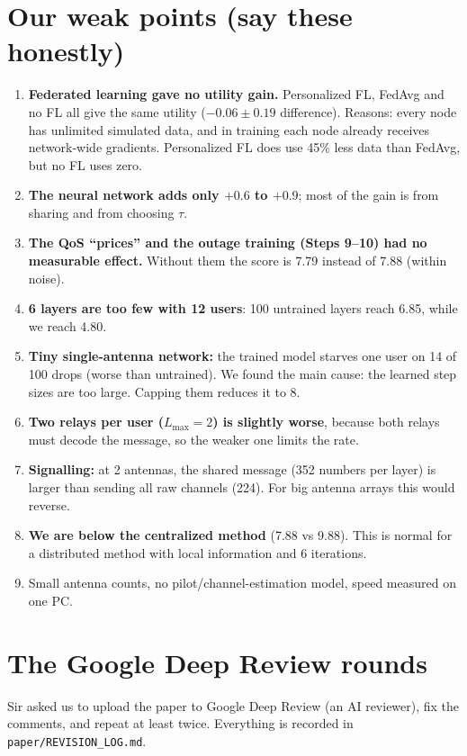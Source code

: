 \documentclass[11pt,a4paper]{article}
\begin{document}
\section{Our weak points (say these honestly)}
\begin{enumerate}
\item \textbf{Federated learning gave no utility gain.} Personalized FL, FedAvg and no FL all give the same
  utility ($-0.06 \pm 0.19$ difference). Reasons: every node has unlimited simulated data, and in training each
  node already receives network-wide gradients. Personalized FL does use 45\% less data than FedAvg, but no FL
  uses zero.
\item \textbf{The neural network adds only $+0.6$ to $+0.9$}; most of the gain is from sharing and from
  choosing $\tau$.
\item \textbf{The QoS ``prices'' and the outage training (Steps 9--10) had no measurable effect.} Without them
  the score is 7.79 instead of 7.88 (within noise).
\item \textbf{6 layers are too few with 12 users}: 100 untrained layers reach 6.85, while we reach 4.80.
\item \textbf{Tiny single-antenna network:} the trained model starves one user on 14 of 100 drops (worse than
  untrained). We found the main cause: the learned step sizes are too large. Capping them reduces it to 8.
\item \textbf{Two relays per user ($L_{\max}=2$) is slightly worse}, because both relays must decode the message,
  so the weaker one limits the rate.
\item \textbf{Signalling:} at 2 antennas, the shared message (352 numbers per layer) is larger than sending all
  raw channels (224). For big antenna arrays this would reverse.
\item \textbf{We are below the centralized method} (7.88 vs 9.88). This is normal for a distributed method with
  local information and 6 iterations.
\item Small antenna counts, no pilot/channel-estimation model, speed measured on one PC.
\end{enumerate}

\section{The Google Deep Review rounds}

Sir asked us to upload the paper to Google Deep Review (an AI reviewer), fix the comments, and repeat at least
twice. Everything is recorded in \texttt{paper/REVISION\_LOG.md}.
\end{document}
